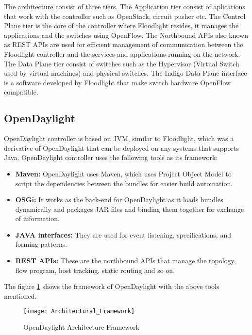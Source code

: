 The architecture consist of three tiers. The Application tier consist of aplications that work with the controller such as OpenStack, circuit pusher etc. The Control Plane tier is the core of the controller where Floodlight resides, it manages the applications and the switches using OpenFlow. The Northbound APIs also known as REST APIs are used for efficient management of communication between the Floodlight controller and the services and applications running on the network. The Data Plane tier consist of switches such as the Hypervisor (Virtual Switch used by virtual machines) and physical switches. The Indigo Data Plane interface is a software developed by Floodlight that make switch hardware OpenFlow compatible.

\subsection{OpenDaylight} \label{Opendaylight}
OpenDaylight controller is based on JVM, similar to Floodlight, which was a derivative of OpenDaylight that can be deployed on any systems that supports Java. OpenDaylight controller uses the following tools as its framework:

\begin{itemize}
	\item \textbf{Maven:} OpenDaylight uses Maven, which uses Project Object Model to script the dependencies between the bundles for easier build automation.
	\item \textbf{OSGi:} It works as the back-end for OpenDaylight as it loads bundles dynamically and packages JAR files and binding them together for exchange of information.
	\item \textbf{JAVA interfaces:} They are used for event listening, specifications, and forming patterns. 
	\item \textbf{REST APIs:} These are the northbound APIs that manage the topology, flow program, host tracking, static routing and so on.
	
\end{itemize}

The figure \ref{fig:OpenDaylight_framework} shows the framework of OpenDaylight with the above tools mentioned.

\begin{figure}
	\centering
	\texttt{[image: Architectural\_Framework]}
	\caption{OpenDaylight Architecture Framework \cite{OpenDaylight_framework}} \label{fig:OpenDaylight_framework}
	\vspace{-10pt}
\end{figure}

